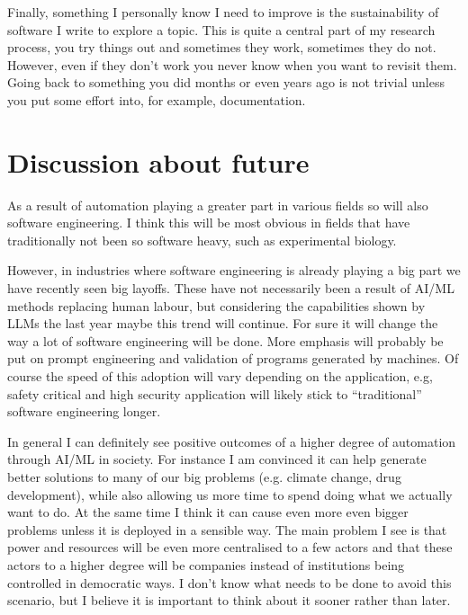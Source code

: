 \documentclass[11pt]{article}
\begin{document}
Finally, something I personally know I need to improve is the sustainability of software I write to explore a topic. This is quite a central part of my research process, you try things out and sometimes they work, sometimes they do not. However, even if they don't work you never know when you want to revisit them. Going back to something you did months or even years ago is not trivial unless you put some effort into, for example, documentation.

\section*{Discussion about future}
As a result of automation playing a greater part in various fields so will also software engineering. I think this will be most obvious in fields that have traditionally not been so software heavy, such as experimental biology.

However, in industries where software engineering is already playing a big part we have recently seen big layoffs. These have not necessarily been a result of AI/ML methods replacing human labour, but considering the capabilities shown by LLMs the last year maybe this trend will continue. For sure it will change the way a lot of software engineering will be done. More emphasis will probably be put on prompt engineering and validation of programs generated by machines. Of course the speed of this adoption will vary depending on the application, e.g, safety critical and high security application will likely stick to ``traditional'' software engineering longer.

In general I can definitely see positive outcomes of a higher degree of automation through AI/ML in society. For instance I am convinced it can help generate better solutions to many of our big problems (e.g. climate change, drug development), while also allowing us more time to spend doing what we actually want to do. At the same time I think it can cause even more even bigger problems unless it is deployed in a sensible way. The main problem I see is that power and resources will be even more centralised to a few actors and that these actors to a higher degree will be companies instead of institutions being controlled in democratic ways. I don't know what needs to be done to avoid this scenario, but I believe it is important to think about it sooner rather than later.



\end{document}
